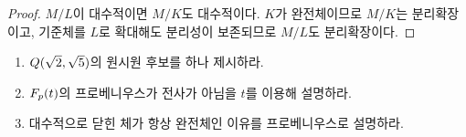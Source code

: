 \begin{proof}
$M/L$이 대수적이면 $M/K$도 대수적이다. $K$가 완전체이므로 $M/K$는 분리확장이고, 기준체를 $L$로 확대해도 분리성이 보존되므로 $M/L$도 분리확장이다.
\end{proof}

\begin{checkpoint}
\begin{enumerate}[label=(\alph*)]
  \item $Q(\sqrt2,\sqrt5)$의 원시원 후보를 하나 제시하라.
  \item $F_p(t)$의 프로베니우스가 전사가 아님을 $t$를 이용해 설명하라.
  \item 대수적으로 닫힌 체가 항상 완전체인 이유를 프로베니우스로 설명하라.
\end{enumerate}
\end{checkpoint}
